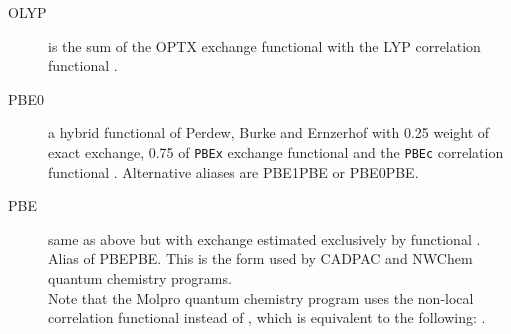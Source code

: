 \begin{description}
\begin{description}

\item[OLYP] is the sum of the OPTX exchange functional with the
  LYP correlation functional \cite{dft:optx,dft:lyp1,dft:lyp2}.



\item[PBE0] a hybrid functional of Perdew, Burke and Ernzerhof with
  0.25 weight of exact exchange, 0.75 of \verb|PBEx| exchange functional and
  the \verb|PBEc| correlation functional \cite{dft:pbe0}.
  Alternative aliases are PBE1PBE or PBE0PBE.

\item[PBE] same as above but with exchange estimated exclusively by
   functional \cite{dft:pbe}. Alias of PBEPBE. 
  This is the form used by CADPAC and NWChem quantum chemistry programs.
  \\
  Note that the Molpro quantum chemistry program uses the 
  non-local correlation functional instead of , which is 
  equivalent to the following:
  .





\end{description}
\end{description}

